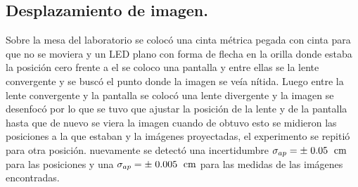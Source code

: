 \documentclass[DIV=calc, paper=a4, fontsize=10pt]{scrartcl}
\begin{document}
\subsection*{\textcolor{carmine}{Desplazamiento de imagen.}}
Sobre la mesa del laboratorio se colocó una cinta métrica pegada con cinta para que no se moviera y un LED plano con forma de flecha en la orilla donde estaba la posición cero frente a el se coloco una pantalla y entre ellas se la lente convergente y se buscó el punto donde la imagen se veía nítida.    Luego entre la lente convergente y la pantalla se colocó una lente divergente y la imagen se desenfocó por lo que se tuvo que ajustar la posición de la lente y de la pantalla hasta que de nuevo se viera la imagen cuando de obtuvo esto se midieron las posiciones a la que estaban y la imágenes proyectadas, el experimento se repitió para otra posición. nuevamente se detectó una incertidumbre $\sigma_{ap}=\pm\hspace{0.1cm}0.05\hspace{0.1cm}\text{ cm}$ para las posiciones y una $\sigma_{ap}=\pm\hspace{0.1cm}0.005\hspace{0.1cm}\text{ cm}$ para las medidas de las imágenes encontradas. 
\end{document}
